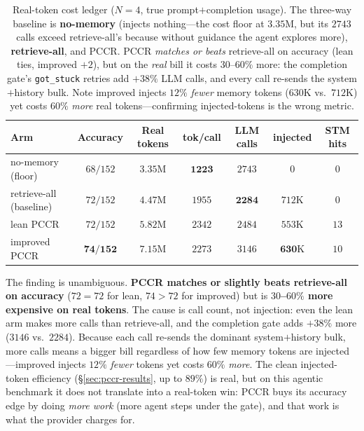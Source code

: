 \documentclass[10pt,twocolumn]{article}
\newcommand{\code}[1]{\texttt{\small #1}}
\begin{document}
\begin{table}[t]
\centering\small
\setlength{\tabcolsep}{6pt}
\begin{tabular}{@{}lcccccc@{}}
\toprule
Arm & Accuracy & Real tokens & tok/call & LLM calls & injected & STM hits \\
\midrule
no-memory (floor)        & $68/152$ & $\mathbf{3.35}$M & $\mathbf{1223}$ & $2743$ & $0$ & $0$ \\
retrieve-all (baseline)  & $72/152$ & $4.47$M & $1955$ & $\mathbf{2284}$ & $712$K & $0$ \\
lean PCCR                & $72/152$ & $5.82$M & $2342$ & $2484$ & $553$K & $13$ \\
improved PCCR            & $\mathbf{74/152}$ & $7.15$M & $2273$ & $3146$ & $\mathbf{630}$K & $10$ \\
\bottomrule
\end{tabular}
\caption{Real-token cost ledger ($N{=}4$, true prompt$+$completion usage). The three-way baseline is
\textbf{no-memory} (injects nothing---the cost floor at $3.35$M, but its $2743$ calls exceed
retrieve-all's because without guidance the agent explores more), \textbf{retrieve-all}, and PCCR.
PCCR \emph{matches or beats} retrieve-all on accuracy (lean ties, improved $+2$), but on the
\emph{real} bill it costs $30$--$60\%$ more: the completion gate's \code{got\_stuck} retries add
$+38\%$ LLM calls, and every call re-sends the system$+$history bulk. Note improved injects $12\%$
\emph{fewer} memory tokens ($630$K vs.\ $712$K) yet costs $60\%$ \emph{more} real tokens---confirming
injected-tokens is the wrong metric.}
\label{tab:realtoken}
\end{table}

The finding is unambiguous. \textbf{PCCR matches or slightly beats retrieve-all on accuracy}
($72{=}72$ for lean, $74{>}72$ for improved) but is \textbf{$30$--$60\%$ more expensive on real
tokens}. The cause is call count, not injection: even the lean arm makes more calls than
retrieve-all, and the completion gate adds $+38\%$ more ($3146$ vs.\ $2284$). Because each call
re-sends the dominant system$+$history bulk, more calls means a bigger bill regardless of how few
memory tokens are injected---improved injects $12\%$ \emph{fewer} tokens yet costs $60\%$ \emph{more}.
The clean injected-token efficiency (\S\ref{sec:pccr-results}, up to $89\%$) is real, but on this
agentic benchmark it does not translate into a real-token win: PCCR buys its accuracy edge by doing
\emph{more work} (more agent steps under the gate), and that work is what the provider charges for.
\end{document}
